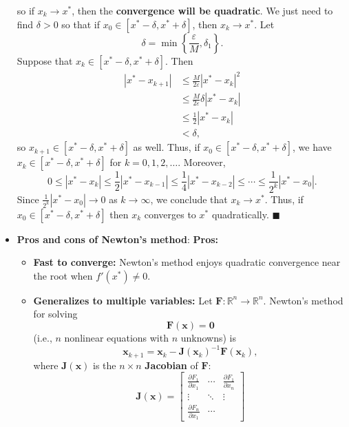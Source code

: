 \documentclass{report}
\begin{document}
\begin{itemize}
    so if $x_k \to x^*$, then the \textbf{convergence will be quadratic}.
    \bigbreak \noindent 
    We just need to find $\delta > 0$ so that if $x_0 \in [x^* - \delta, x^* + \delta]$, then $x_k \to x^*$.
    Let
    $$\delta = \min\left\{\frac{\varepsilon}{M}, \delta_1\right\}.$$
    Suppose that $x_k \in [x^* - \delta, x^* + \delta]$. Then
    \begin{align*}
        \left|x^* - x_{k+1}\right| 
&\leq \frac{M}{2\varepsilon} \left|x^* - x_k\right|^2 \\
&\leq \frac{M}{2\varepsilon} \delta \left|x^* - x_k\right| \\
&\leq \frac{1}{2} \left|x^* - x_k\right| \\
&< \delta,
    \end{align*}
    so $x_{k+1} \in [x^* - \delta, x^* + \delta]$ as well. Thus, if $x_0 \in [x^* - \delta, x^* + \delta]$, we have $x_k \in [x^* - \delta, x^* + \delta]$ for $k = 0, 1, 2, \ldots$.
    \bigbreak \noindent 
    Moreover,
    $$0 \leq \left|x^* - x_k\right| \leq \frac{1}{2} \left|x^* - x_{k-1}\right| \leq \frac14 \left|x^* - x_{k-2}\right| \leq \cdots \leq \frac{1}{2^k} \left|x^* - x_{0}\right|.$$
    Since $\frac{1}{2^k} \left|x^* - x_{0}\right| \to 0$ as $k \to \infty$, we conclude that $x_k \to x^*$. Thus, if $x_0 \in [x^* - \delta, x^* + \delta]$ then $x_k$ converges to $x^*$ quadratically. $\blacksquare$
\item \textbf{Pros and cons of Newton's method}:
    \bigbreak \noindent 
    \textbf{Pros:}
    \begin{itemize}
        \item \textbf{Fast to converge:} Newton's method enjoys quadratic convergence near the root when $f'(x^*) \neq 0$.
        \item \textbf{Generalizes to multiple variables:} Let $\mathbf{F} \colon \mathbb{R}^n \to \mathbb{R}^n$. Newton's method for solving 
        $$\mathbf{F}(\mathbf{x}) = \mathbf{0}$$ 
        (i.e., $n$ nonlinear equations with $n$ unknowns) is
        $$ \mathbf{x}_{k+1} = \mathbf{x}_k - \mathbf{J}(\mathbf{x}_k)^{-1} \mathbf{F}(\mathbf{x}_k),$$
        where $\mathbf{J}(\mathbf{x})$ is the $n \times n$ \textbf{Jacobian} of $\mathbf{F}$:
        $$
        \mathbf{J}(\mathbf{x}) = 
        \begin{bmatrix}
            \frac{\partial F_1}{\partial x_1}& \cdots &
            \frac{\partial F_1}{\partial x_n}\\
            \vdots & \ddots & \vdots \\
            \frac{\partial F_n}{\partial x_1}& \cdots &

\end{bmatrix}$$
\end{itemize}
\end{itemize}
\end{document}
